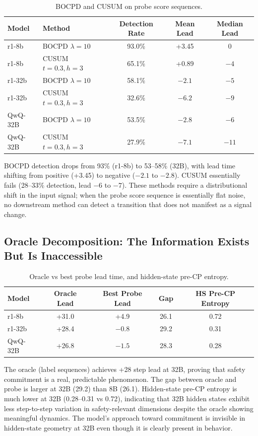 \documentclass[11pt]{article}
\begin{document}
\begin{table}[h]
\centering
\caption{BOCPD and CUSUM on probe score sequences.}
\label{tab:cpd}
\small
\begin{tabular}{llccc}
\toprule
Model & Method & Detection Rate & Mean Lead & Median Lead \\
\midrule
r1-8b & BOCPD $\lambda{=}10$ & 93.0\% & +3.45 & 0 \\
r1-8b & CUSUM $t{=}0.3,h{=}3$ & 65.1\% & +0.89 & $-4$ \\
\midrule
r1-32b & BOCPD $\lambda{=}10$ & 58.1\% & $-2.1$ & $-5$ \\
r1-32b & CUSUM $t{=}0.3,h{=}3$ & 32.6\% & $-6.2$ & $-9$ \\
\midrule
QwQ-32B & BOCPD $\lambda{=}10$ & 53.5\% & $-2.8$ & $-6$ \\
QwQ-32B & CUSUM $t{=}0.3,h{=}3$ & 27.9\% & $-7.1$ & $-11$ \\
\bottomrule
\end{tabular}
\end{table}

BOCPD detection drops from 93\% (r1-8b) to 53--58\% (32B), with lead time shifting from positive (+3.45) to negative ($-2.1$ to $-2.8$). CUSUM essentially fails (28--33\% detection, lead $-6$ to $-7$). These methods require a distributional shift in the input signal; when the probe score sequence is essentially flat noise, no downstream method can detect a transition that does not manifest as a signal change.

\subsection{Oracle Decomposition: The Information Exists But Is Inaccessible}

\begin{table}[h]
\centering
\caption{Oracle vs best probe lead time, and hidden-state pre-CP entropy.}
\label{tab:oracle}
\small
\begin{tabular}{lcccc}
\toprule
Model & Oracle Lead & Best Probe Lead & Gap & HS Pre-CP Entropy \\
\midrule
r1-8b & +31.0 & +4.9 & 26.1 & 0.72 \\
r1-32b & +28.4 & $-0.8$ & 29.2 & 0.31 \\
QwQ-32B & +26.8 & $-1.5$ & 28.3 & 0.28 \\
\bottomrule
\end{tabular}
\end{table}

The oracle (label sequences) achieves +28 step lead at 32B, proving that safety commitment is a real, predictable phenomenon. The gap between oracle and probe is larger at 32B (29.2) than 8B (26.1). Hidden-state pre-CP entropy is much lower at 32B (0.28--0.31 vs 0.72), indicating that 32B hidden states exhibit less step-to-step variation in safety-relevant dimensions despite the oracle showing meaningful dynamics. The model's approach toward commitment is invisible in hidden-state geometry at 32B even though it is clearly present in behavior.
\end{document}
